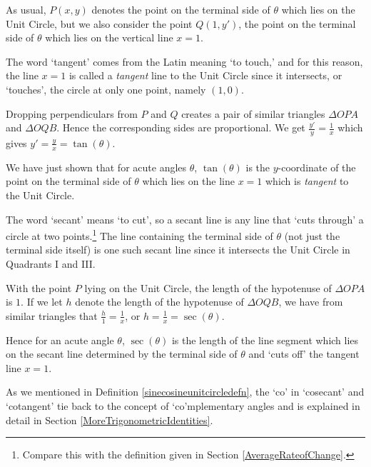 \documentclass{ximera}
\begin{document}
As usual, $P(x,y)$ denotes the point on the terminal side of $\theta$ which lies on the Unit Circle, but we also consider  the point $Q(1,y')$,  the point on the terminal side of $\theta$ which lies on the vertical line $x=1$. 



The word `tangent' comes from the Latin meaning `to touch,' and for this reason, the line $x=1$ is called a \textit{tangent} line to the Unit Circle since it intersects, or `touches', the circle at only one point, namely $(1,0)$.  



Dropping perpendiculars from $P$ and $Q$ creates a pair of similar triangles $\Delta OPA$ and $\Delta OQB$.  Hence the corresponding sides are proportional.  We get  $\frac{y'}{y} = \frac{1}{x}$ which gives  $y' = \frac{y}{x} = \tan(\theta)$.




 We have just shown that for acute angles $\theta$, $\tan(\theta)$ is the $y$-coordinate of the point on the terminal side of $\theta$ which lies on the line $x = 1$ which is \textit{tangent} to the Unit Circle. 
 
 
 
 The word `secant' means `to cut', so a secant line is any line that `cuts through' a circle at two points.\footnote{Compare this with the definition given in Section \ref{AverageRateofChange}.}  The line containing the terminal side of $\theta$ (not just the terminal side itself) is one such secant line since it intersects the Unit Circle in Quadrants I and III.   
 
 
 
 With the point $P$ lying on the Unit Circle, the length of the hypotenuse of $\Delta OPA$ is $1$. If we let $h$ denote the length of the hypotenuse of $\Delta OQB$, we have from similar triangles that $\frac{h}{1} = \frac{1}{x}$, or $h = \frac{1}{x} = \sec(\theta)$.  
 
 
 
 Hence for an acute angle $\theta$, $\sec(\theta)$ is the length of the line segment which lies on the secant line determined by the terminal side of $\theta$ and `cuts off' the tangent line $x=1$.  
 
 
 
As we mentioned in Definition \ref{sinecosineunitcircledefn}, the `co' in `cosecant' and `cotangent' tie back to the concept of `co'mplementary angles and is explained in detail in Section \ref{MoreTrigonometricIdentities}.
\end{document}
